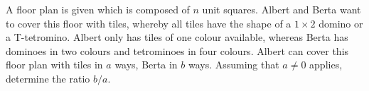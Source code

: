 A floor plan is given which is composed of $n$ unit squares.
Albert and Berta want to cover this floor with tiles,
whereby all tiles have the shape of a $1\times 2$ domino or a T-tetromino.
Albert only has tiles of one colour available, whereas Berta has dominoes in two colours
and tetrominoes in four colours. Albert can cover this floor plan with tiles in $a$ ways,
Berta in $b$ ways. Assuming that $a\neq 0$ applies, determine the ratio $b/a$.